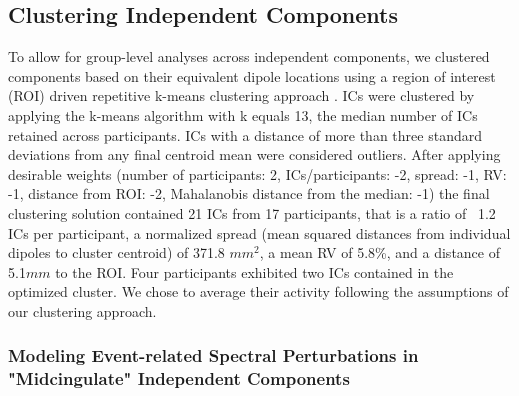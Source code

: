 \subsection{Clustering Independent Components}
To allow for group-level analyses across independent components, we clustered components based on their equivalent dipole locations using a region of interest (ROI) driven repetitive k-means clustering approach \cite{Gramann2018}. ICs were clustered by applying the k-means algorithm with k equals 13, the median number of ICs retained across participants. ICs with a distance of more than three standard deviations from any final centroid mean were considered outliers. After applying desirable weights (number of participants: 2, ICs/participants: -2, spread: -1, RV: -1, distance from ROI: -2, Mahalanobis distance from the median: -1) the final clustering solution contained 21 ICs from 17 participants, that is a ratio of ~1.2 ICs per participant, a normalized spread (mean squared distances from individual dipoles to cluster centroid) of 371.8 $mm^2$, a mean RV of 5.8\%, and a distance of 5.1$mm$ to the ROI. Four participants exhibited two ICs contained in the optimized cluster. We chose to average their activity following the assumptions of our clustering approach.

 
\subsubsection{Modeling Event-related Spectral Perturbations in "Midcingulate" Independent Components}

